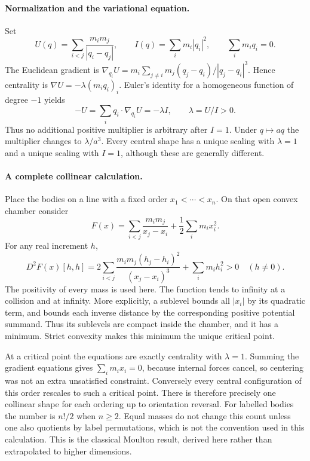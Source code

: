 \documentclass[11pt]{article}
\begin{document}
\paragraph{Normalization and the variational equation.}
Set
\[
 U(q)=\sum_{i<j}\frac{m_im_j}{|q_i-q_j|},\qquad
 I(q)=\sum_i m_i|q_i|^2,\qquad \sum_i m_iq_i=0.
\]
The Euclidean gradient is
$\nabla_{q_i}U=m_i\sum_{j\ne i}m_j(q_j-q_i)/|q_j-q_i|^3$.
Hence centrality is $\nabla U=-\lambda(m_iq_i)_i$.
Euler's identity for a homogeneous function of degree $-1$ yields
\[
 -U=\sum_iq_i\cdot\nabla_{q_i}U=-\lambda I,\qquad
                         \lambda=U/I>0.
\]
Thus no additional positive multiplier is arbitrary after $I=1$.
Under $q\mapsto aq$ the multiplier changes to $\lambda/a^3$.
Every central shape has a unique scaling with $\lambda=1$ and
a unique scaling with $I=1$, although these are generally different.

\paragraph{A complete collinear calculation.}
Place the bodies on a line with a fixed order
$x_1<\cdots<x_n$. On that open convex chamber consider
\[
 F(x)=\sum_{i<j}\frac{m_im_j}{x_j-x_i}
                  +\frac12\sum_i m_ix_i^2.
\]
For any real increment $h$,
\begin{equation}\label{a410:hessian}
 D^2F(x)[h,h]
 =2\sum_{i<j}\frac{m_im_j(h_j-h_i)^2}{(x_j-x_i)^3}
                      +\sum_i m_ih_i^2>0
 \quad(h\ne0).
\end{equation}
The positivity of every mass is used here. The function tends to
infinity at a collision and at infinity. More explicitly, a sublevel
bounds all $|x_i|$ by its quadratic term, and bounds each inverse
distance by the corresponding positive potential summand.
Thus its sublevels are compact inside the chamber, and it has a
minimum. Strict convexity makes this minimum the unique critical point.

At a critical point the equations are exactly centrality with
$\lambda=1$. Summing the gradient equations gives
$\sum_i m_ix_i=0$, because internal forces cancel, so centering was
not an extra unsatisfied constraint. Conversely every central
configuration of this order rescales to such a critical point.
There is therefore precisely one collinear shape for each ordering
up to orientation reversal. For labelled bodies the number is
$n!/2$ when $n\geq2$. Equal masses do not change this count unless
one also quotients by label permutations, which is not the convention
used in this calculation. This is the classical Moulton result,
derived here rather than extrapolated to higher dimensions.
\end{document}
